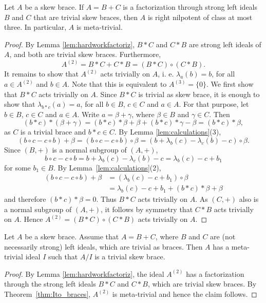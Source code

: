 \begin{theorem} 
\label{thm:Ito_braces}
Let $A$ be a skew brace. If $A=B+C$ is a factorization through strong left ideals $B$ and $C$ that are trivial skew  braces,
then $A$ is right nilpotent of class at most three. In particular, $A$ is meta-trivial.
\end{theorem}

\begin{proof}
By Lemma \ref{lem:hardworkfactoriz}, $B*C$ and $C*B$ are strong left ideals of $A$, and both are trivial skew  braces. Furthermore, 
\[
A^{(2)} = B*C + C*B = (B*C) \circ (C*B).
\]
It remains to show that $A^{(2)}$ acts trivially on $A$, i. e. $\lambda_{a}(b)=b$, for all $a\in A^{(2)}$ and $b\in A$. Note that this is equivalent to $A^{(3)}=\{ 0\}$. We first show that $B*C$ acts trivially on $A$. Since $B*C$ is trivial as skew brace, it is enough to show that $\lambda_{b*c}(a)=a$, for all $b\in B$, $c\in C$ and $a\in A$. For that purpose, 
let $b\in B$, $c\in C$ and $a\in A$. Write $a=\beta+\gamma$, where $\beta\in B$ and $\gamma\in C$. Then
\[
(b*c)*(\beta+\gamma)=(b*c)*\beta+\beta+(b*c)*\gamma-\beta=(b*c)*\beta, 
\]
as $C$ is a trivial brace and $b*c\in C$. By Lemma \ref{lem:calculations}(3), 
\[
(b\circ c - c\circ b) + \beta = (b\circ c - c \circ b) \circ \beta = (b + \lambda_b(c) - \lambda_c(b) - c) \circ \beta.
\]
Since $(B,+)$ is a normal subgroup of $(A,+)$, 
\[
b\circ c-c\circ b=b+\lambda_b(c)-\lambda_c(b)-c=\lambda_b(c)-c+b_1
\]
for some $b_1\in B$. By Lemma~\ref{lem:calculations}(2), 
\begin{align*}
    (b\circ c - c\circ b) + \beta & =(\lambda_b(c) - c + b_1) \circ \beta\\
                                  & =\lambda_b(c) - c + b_1 + (b*c)*\beta + \beta
\end{align*}
and therefore $(b*c)*\beta = 0$. Thus $B*C$ acts trivially on $A$. As $(C,+)$ also is a normal subgroup of $(A,+)$,
it follows by symmetry that $C*B$ acts trivially on $A$. Hence $A^{(2)}=(B*C)\circ (C*B)$ acts trivially on $A$.
\end{proof}

\begin{corollary}
    Let $A$ be a skew brace. Assume that $A= B + C$, where $B$ and $C$ are (not necessarily strong) left ideals,
    which are trivial as braces. Then $A$ has a meta-trivial ideal $I$ such that $A/I$ is a trivial skew brace.
\end{corollary}

\begin{proof}
    By Lemma \ref{lem:hardworkfactoriz}, the ideal $A^{(2)}$ has a factorization through the strong left ideals $B*C$ and $C*B$,
    which are trivial skew braces. By Theorem~\ref{thm:Ito_braces}, $A^{(2)}$ is meta-trivial and hence the claim follows.
\end{proof}

